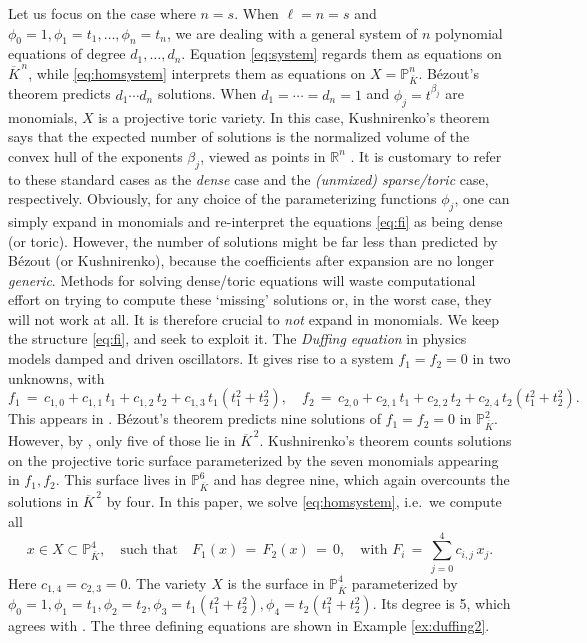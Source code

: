 \documentclass[12pt]{article}
\theoremstyle{definition}
\newenvironment{example}
  {\pushQED{\qed}\renewcommand{\qedsymbol}{$\diamond$}\examplex}
  {\popQED\endexamplex}
\theoremstyle{remark}
\begin{document}
Let us focus on the case where $n = s$. When $\ell = n = s$ and $\phi_0 = 1, \phi_1 = t_1, \ldots, \phi_n = t_n$, we are dealing with a general system of $n$ polynomial equations of degree $d_1, \ldots, d_n$. Equation \eqref{eq:system} regards them as equations on $\overline{K}^{\, n}$, while \eqref{eq:homsystem} interprets them as equations on $X = \mathbb{P}_{\overline K}^n$. B\'ezout's theorem predicts $d_1 \cdots d_n$ solutions. When $d_1 = \cdots = d_n = 1$ and $\phi_j = t^{\beta_j}$ are monomials, $X$ is a projective toric variety. In this case, Kushnirenko's theorem says that the expected number of solutions is the normalized volume of the convex hull of the exponents $\beta_j$, viewed as points in $\mathbb{R}^n$ \cite[Section 3.4]{telen2022introduction}. It is customary to refer to these standard cases as the \emph{dense} case and the \emph{(unmixed) sparse/toric} case, respectively. Obviously, for any choice of the parameterizing functions $\phi_j$, one can simply expand in monomials and re-interpret the equations \eqref{eq:fi} as being dense (or toric). However, the number of solutions might be far less than predicted by B\'ezout (or Kushnirenko), because the coefficients after expansion are no longer \emph{generic}. Methods for solving dense/toric equations will waste computational effort on trying to compute these `missing' solutions or, in the worst case, they will not work at all. It is therefore crucial to \emph{not} expand in monomials. We keep the structure \eqref{eq:fi}, and seek to exploit it. 
\begin{example}[$n = s = 2, \ell = 4$] \label{ex:duffing}
The \emph{Duffing equation} in physics models damped and driven oscillators. It gives rise to a system $f_1 = f_2 = 0$ in two unknowns, with
\[f_1 \, = \, c_{1,0} + c_{1,1} \, t_1 + c_{1,2} \, t_2 + c_{1,3} \, t_1(t_1^2+t_2^2), \quad f_2 \, = \, c_{2,0} + c_{2,1} \, t_1 + c_{2,2} \, t_2 + c_{2,4} \, t_2(t_1^2+t_2^2). \]
This appears in \cite[Section 3]{breiding2022algebraic}.
B\'ezout's theorem predicts nine solutions of $f_1 = f_2 = 0$ in $\mathbb{P}^2_{\overline{K}}$. However, by \cite[Theorem 3.1]{breiding2022algebraic}, only five of those lie in $\overline{K}^{\, 2}$. Kushnirenko's theorem counts solutions on the projective toric surface parameterized by the seven monomials appearing in $f_1, f_2$. This surface lives in $\mathbb{P}^6_{\overline{K}}$ and has degree nine, which again overcounts the solutions in ${\overline{K}}^{\,2}$ by four. In this paper, we solve \eqref{eq:homsystem}, i.e.~we compute all
\begin{equation} \label{eq:homsysduffing}
x \in X \subset \mathbb{P}^4_{\overline{K}} , \quad \text{such that} \quad F_1(x) \, =  \, F_2(x) \, = \, 0,  \quad \text{with } F_i \, = \, \textstyle \sum_{j = 0}^4 c_{i,j} \, x_j. 
\end{equation}
Here $c_{1,4} = c_{2,3} = 0$. The variety $X$ is the surface in $\mathbb{P}^4_{\overline{K}}$ parameterized by $\phi_0 = 1, \phi_1 = t_1, \phi_2 = t_2, \phi_3 = t_1(t_1^2 + t_2^2), \phi_4 = t_2(t_1^2 + t_2^2)$. Its degree is 5, which agrees with \cite[Theorem 3.1]{breiding2022algebraic}. The three defining equations are shown in Example \ref{ex:duffing2}.
\end{example}
\end{document}
